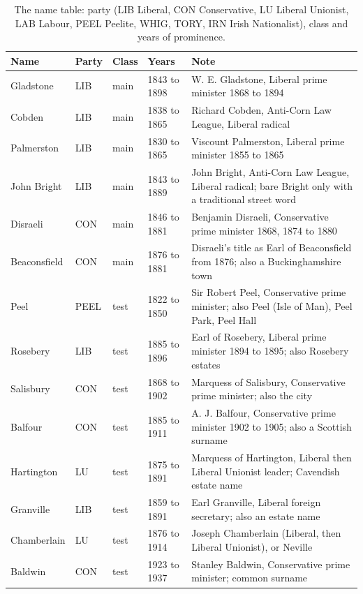 \documentclass[11pt,a4paper]{article}
\begin{document}
\begin{small}\begin{longtable}{llllp{7.4cm}}\caption{The name table: party (LIB Liberal, CON Conservative, LU Liberal Unionist, LAB Labour, PEEL Peelite, WHIG, TORY, IRN Irish Nationalist), class and years of prominence.}\label{tab:names}\\\toprule Name & Party & Class & Years & Note\\\midrule\endhead
Gladstone & LIB & main & 1843 to 1898 & W. E. Gladstone, Liberal prime minister 1868 to 1894\\
Cobden & LIB & main & 1838 to 1865 & Richard Cobden, Anti-Corn Law League, Liberal radical\\
Palmerston & LIB & main & 1830 to 1865 & Viscount Palmerston, Liberal prime minister 1855 to 1865\\
John Bright & LIB & main & 1843 to 1889 & John Bright, Anti-Corn Law League, Liberal radical; bare Bright only with a traditional street word\\
Disraeli & CON & main & 1846 to 1881 & Benjamin Disraeli, Conservative prime minister 1868, 1874 to 1880\\
Beaconsfield & CON & main & 1876 to 1881 & Disraeli's title as Earl of Beaconsfield from 1876; also a Buckinghamshire town\\
Peel & PEEL & test & 1822 to 1850 & Sir Robert Peel, Conservative prime minister; also Peel (Isle of Man), Peel Park, Peel Hall\\
Rosebery & LIB & test & 1885 to 1896 & Earl of Rosebery, Liberal prime minister 1894 to 1895; also Rosebery estates\\
Salisbury & CON & test & 1868 to 1902 & Marquess of Salisbury, Conservative prime minister; also the city\\
Balfour & CON & test & 1885 to 1911 & A. J. Balfour, Conservative prime minister 1902 to 1905; also a Scottish surname\\
Hartington & LU & test & 1875 to 1891 & Marquess of Hartington, Liberal then Liberal Unionist leader; Cavendish estate name\\
Granville & LIB & test & 1859 to 1891 & Earl Granville, Liberal foreign secretary; also an estate name\\
Chamberlain & LU & test & 1876 to 1914 & Joseph Chamberlain (Liberal, then Liberal Unionist), or Neville\\
Baldwin & CON & test & 1923 to 1937 & Stanley Baldwin, Conservative prime minister; common surname\\

\end{longtable}
\end{small}
\end{document}

